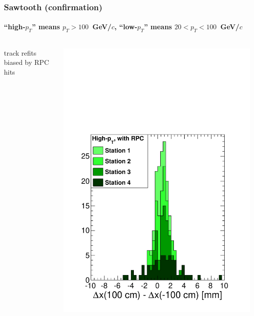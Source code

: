 \documentclass[compress]{beamer}
\begin{document}
\begin{frame}
\frametitle{Sawtooth (confirmation)}
\framesubtitle{``high-$p_T$'' means $p_T > 100$~GeV/$c$, ``low-$p_T$'' means $20 < p_T < 100$~GeV/$c$}

\vspace{-0.25 cm}
\begin{columns}
\begin{center}
track refits biased by RPC hits
\end{center}
\includegraphics[width=\linewidth]{sawtooth_high_withrpc.pdf}


\end{columns}
\end{frame}
\end{document}
